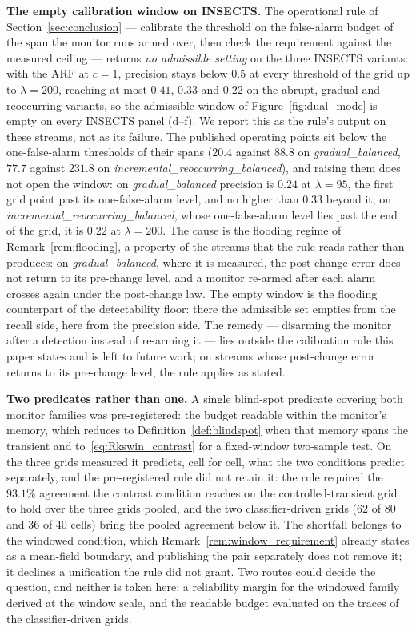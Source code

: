 \documentclass[smallextended]{svjour3}
\begin{document}
\textbf{The empty calibration window on INSECTS.} The operational rule of Section~\ref{sec:conclusion} --- calibrate the threshold on the false-alarm budget of the span the monitor runs armed over, then check the requirement against the measured ceiling --- returns \emph{no admissible setting} on the three INSECTS variants: with the ARF at $c = 1$, precision stays below $0.5$ at every threshold of the grid up to $\lambda = 200$, reaching at most $0.41$, $0.33$ and $0.22$ on the abrupt, gradual and reoccurring variants, so the admissible window of Figure~\ref{fig:dual_mode} is empty on every INSECTS panel (d--f). We report this as the rule's output on these streams, not as its failure. The published operating points sit below the one-false-alarm thresholds of their spans ($20.4$ against $88.8$ on \emph{gradual\_balanced}, $77.7$ against $231.8$ on \emph{incremental\_reoccurring\_balanced}), and raising them does not open the window: on \emph{gradual\_balanced} precision is $0.24$ at $\lambda = 95$, the first grid point past its one-false-alarm level, and no higher than $0.33$ beyond it; on \emph{incremental\_reoccurring\_balanced}, whose one-false-alarm level lies past the end of the grid, it is $0.22$ at $\lambda = 200$. The cause is the flooding regime of Remark~\ref{rem:flooding}, a property of the streams that the rule reads rather than produces: on \emph{gradual\_balanced}, where it is measured, the post-change error does not return to its pre-change level, and a monitor re-armed after each alarm crosses again under the post-change law. The empty window is the flooding counterpart of the detectability floor: there the admissible set empties from the recall side, here from the precision side. The remedy --- disarming the monitor after a detection instead of re-arming it --- lies outside the calibration rule this paper states and is left to future work; on streams whose post-change error returns to its pre-change level, the rule applies as stated.

\textbf{Two predicates rather than one.} A single blind-spot predicate covering both monitor families was pre-registered: the budget readable within the monitor's memory, which reduces to Definition~\ref{def:blindspot} when that memory spans the transient and to~\eqref{eq:Rkswin_contrast} for a fixed-window two-sample test. On the three grids measured it predicts, cell for cell, what the two conditions predict separately, and the pre-registered rule did not retain it: the rule required the $93.1\%$ agreement the contrast condition reaches on the controlled-transient grid to hold over the three grids pooled, and the two classifier-driven grids ($62$ of $80$ and $36$ of $40$ cells) bring the pooled agreement below it. The shortfall belongs to the windowed condition, which Remark~\ref{rem:window_requirement} already states as a mean-field boundary, and publishing the pair separately does not remove it; it declines a unification the rule did not grant. Two routes could decide the question, and neither is taken here: a reliability margin for the windowed family derived at the window scale, and the readable budget evaluated on the traces of the classifier-driven grids.
\end{document}
